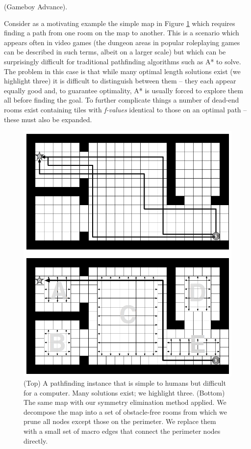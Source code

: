 (Gameboy Advance). 
\par
Consider as a motivating example the simple map in Figure \ref{fig-overview} which
requires finding a path from one room on the map to another. 
This is a scenario which appears often in video games (the dungeon areas in popular roleplaying games
can be described in such terms, albeit on a larger scale) but which can be surprisingly difficult for 
traditional pathfinding algorithms such as A* to solve.
The problem in this case is that while many optimal length solutions exist (we highlight three) it is
difficult to distinguish between them -- they each appear equally good and, to guarantee optimality,
A* is usually forced to explore them all before finding the goal.
To further complicate things a number of dead-end rooms exist containing tiles with \emph{f-values} identical
to those on an optimal path -- these must also be expanded.

\begin{figure}[tb]
       \begin{center}
                       \includegraphics[scale=0.30, trim = 10mm 10mm 10mm 0mm]{diagrams/overview.png}
       \end{center}
	\vspace{-3pt}
       \caption{(Top) A pathfinding instance that is simple to humans but difficult for a computer. 
				Many solutions exist; we highlight three. 
				(Bottom) The same map with our symmetry elimination method applied. We decompose the map
				into a set of obstacle-free rooms from which we prune all nodes except those on the perimeter.
				We replace them with a small set of macro edges that connect the perimeter nodes directly.} 
       \label{fig-overview}
\end{figure}

